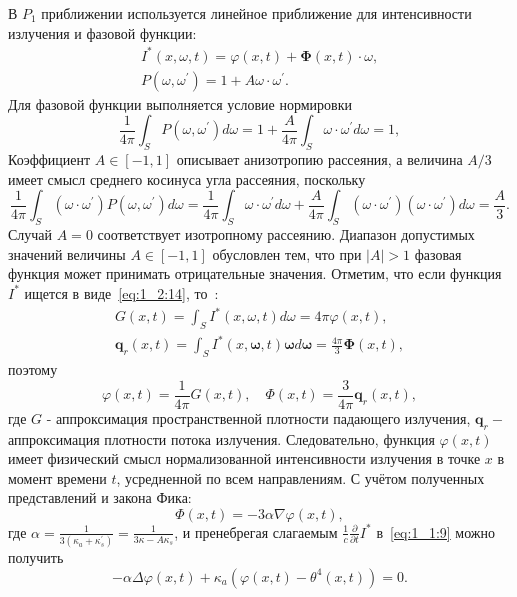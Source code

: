В $P_{1}$ приближении используется линейное приближение
для интенсивности излучения и фазовой функции:
\begin{gather}
    I^{*}(x, \omega, t) = \varphi(x, t)
    +\boldsymbol{\Phi}(x, t) \cdot \omega, \label{eq:1_2:14}\\
    P\left(\omega, \omega^{\prime}\right)= 1
    + A \omega \cdot \omega^{\prime}. \label{eq:1_2:15}
\end{gather}
Для фазовой функции выполняется условие нормировки
\[
    \frac{1}{4 \pi} \int_{S} P\left(\omega, \omega^{\prime}\right) d \omega=1+\frac{A}{4 \pi}
    \int_{S} \omega \cdot \omega^{\prime} d \omega=1,
\]
Коэффициент $A \in[-1,1]$ описывает анизотропию рассеяния,
а величина $A / 3$ имеет смысл среднего косинуса угла рассеяния, поскольку
\[
    \frac{1}{4 \pi} \int_{S}\left(\omega \cdot \omega^{\prime}\right)
    P\left(\omega, \omega^{\prime}\right) d \omega=\frac{1}{4 \pi}
    \int_{S} \omega \cdot \omega^{\prime} d \omega+\frac{A}{4 \pi}
    \int_{S}\left(\omega \cdot \omega^{\prime}\right)
    \left(\omega \cdot \omega^{\prime}\right) d \omega=\frac{A}{3}.
\]
Случай $A=0$ соответствует изотропному рассеянию.
Диапазон допустимых значений величины $A \in[-1,1]$ обусловлен тем, что при $|A|>1$
фазовая функция может принимать отрицательные значения.
Отметим, что если функция $I^*$ ищется в виде~\eqref{eq:1_2:14},
то~\cite[502]{modest2013radiative}:
\begin{gather*}
    G(x, t)=\int_{S} I^{*}(x, \omega, t) d \omega=4 \pi \varphi(x, t), \\
    \mathbf{q}_{r}(x, t)=\int_{S} I^{*}(x, \boldsymbol{\omega}, t)
    \boldsymbol{\omega} d \boldsymbol{\omega}=\frac{4 \pi}{3} \boldsymbol{\Phi}(x, t),
\end{gather*}
поэтому
\[
    \varphi(x, t)=\frac{1}{4 \pi} G(x, t),
    \quad \Phi(x, t)=\frac{3}{4 \pi} \mathbf{q}_{r}(x, t),
\]
где $G$ - аппроксимация пространственной плотности падающего излучения,
$\mathbf{q}_{r}-$ аппроксимация плотности потока излучения.
Следовательно, функция $\varphi(x, t)$ имеет физический смысл
нормализованной интенсивности излучения в
точке $x$ в момент времени $t$, усредненной по всем направлениям.
С учётом полученных представлений и закона Фика:
\begin{equation}
    \label{eq:1_2:20}
    \Phi(x, t)=-3 \alpha \nabla \varphi(x, t),
\end{equation}
где $\alpha=\frac{1}{3\left(\kappa_{a}+\kappa_{s}^{\prime}\right)} =\frac{1}{3 \kappa-A \kappa_{s}}$,
и пренебрегая слагаемым $\frac{1}{c}\frac{\partial}{\partial t}I^*$ в~\eqref{eq:1_1:9}
можно получить~\cite{Kovtanyuk2014a}
\begin{equation}
    \label{eq:1_2:21}
    -\alpha \Delta \varphi(x, t)+\kappa_{a}\left(\varphi(x, t)-\theta^{4}(x, t)\right)=0.
\end{equation}

